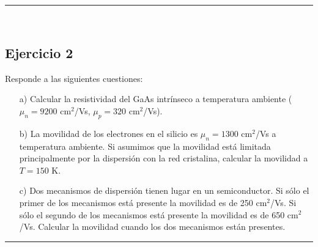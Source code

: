 \rule{\textwidth}{0.1pt} \\[2pt]

\subsection{Ejercicio 2}

Responde a las siguientes cuestiones:
\begin{enumerate}
	\item[a)] Calcular la resistividad del GaAs intrínseco a temperatura ambiente ($\mu_n = 9200$ cm$^2$/Vs, $\mu_p = 320$ cm$^2$/Vs).

	\item[b)] La movilidad de los electrones en el silicio es $\mu_n = 1300$ cm$^2$/Vs a temperatura ambiente. Si asumimos que la movilidad está limitada principalmente por la dispersión con la red cristalina, calcular la movilidad a $T= 150$ K.

	\item[c)] Dos mecanismos de dispersión tienen lugar en un semiconductor. Si sólo el primer de los mecanismos está presente la movilidad es de 250 cm$^2$/Vs. Si sólo el segundo de los mecanismos está presente la movilidad es de 650 cm$^2$/Vs. Calcular la movilidad cuando los dos mecanismos están presentes.
\end{enumerate}

\rule{\textwidth}{0.1pt} \\[2pt]

